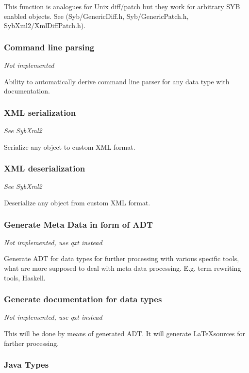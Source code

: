 \documentclass[a4paper]{article}
\begin{document}
This function is analogues for Unix diff/patch but they work for arbitrary SYB enabled objects.
See (Syb/GenericDiff.h, Syb/GenericPatch.h, SybXml2/XmlDiffPatch.h).

\subsubsection{Command line parsing}

\emph{Not implemented}

Ability to automatically derive command line parser for any data type with documentation.

\subsubsection{XML serialization}

\emph{See SybXml2}

Serialize any object to custom XML format.

\subsubsection{XML deserialization}

\emph{See SybXml2}

Deserialize any object from custom XML format.

\subsubsection{Generate Meta Data in form of ADT}

\emph{Not implemented, use qxt instead}

Generate ADT for data types for further processing with various specific tools, what are more supposed to deal with meta data processing.
E.g. term rewriting tools, Haskell.

\subsubsection{Generate documentation for data types}

\emph{Not implemented, use qxt instead}

This will be done by means of generated ADT. It will generate \LaTeX sources for farther processing.

\subsubsection{Java Types}
\end{document}
